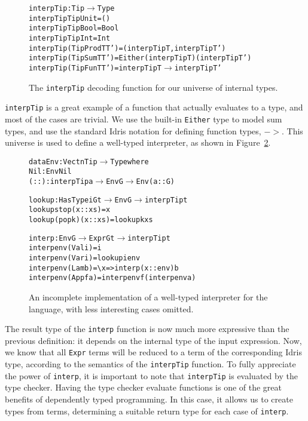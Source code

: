 \begin{figure}
\begin{alltt}
interpTip : Tip \(\rightarrow\) Type
interpTip TipUnit        = ()
interpTip TipBool        = Bool
interpTip TipInt         = Int
interpTip (TipProd T T') = (interpTip T, interpTip T')
interpTip (TipSum T T')  = Either (interpTip T) (interpTip T')
interpTip (TipFun T T')  = interpTip T \(\to\) interpTip T'
\end{alltt}
\caption{The \texttt{interpTip} decoding function for our universe of internal types.}
\label{fig:interpTip}
\end{figure}

\texttt{interpTip} is a great example of a function that actually evaluates to a type, and most of the cases are trivial. We use the built-in \texttt{Either} type to model sum types, and use the standard Idris notation for defining function types, $->$. This universe is used to define a well-typed interpreter, as shown in Figure~\ref{fig:well-typed-interpreter}.

\begin{figure}
\begin{alltt}
data Env : Vect n Tip \(\to\) Type where
  Nil  : Env Nil
  (::) : interpTip a \(\to\) Env G \(\to\) Env (a :: G)

lookup : HasType i G t \(\to\) Env G \(\to\) interpTip t
lookup stop    (x :: xs) = x
lookup (pop k) (x :: xs) = lookup k xs

interp : Env G \(\to\) Expr G t \(\to\) interpTip t
interp env (Val i)   = i
interp env (Var i)   = lookup i env
interp env (Lam b)   = \textbackslash{x} => interp (x :: env) b
interp env (App f a) = interp env f (interp env a)
\end{alltt}
\caption{An incomplete implementation of a well-typed interpreter for the language, with less interesting cases omitted.}
\label{fig:well-typed-interpreter}
\end{figure}

The result type of the \texttt{interp} function is now much more expressive than the previous definition: it depends on the internal type of the input expression. Now, we know that all \texttt{Expr} terms will be reduced to a term of the corresponding Idris type, according to the semantics of the \texttt{interpTip} function. To fully appreciate the power of \texttt{interp}, it is important to note that \texttt{interpTip} is evaluated by the type checker. Having the type checker evaluate functions is one of the great benefits of dependently typed programming. In this case, it allows us to create types from terms, determining a suitable return type for each case of \texttt{interp}.


